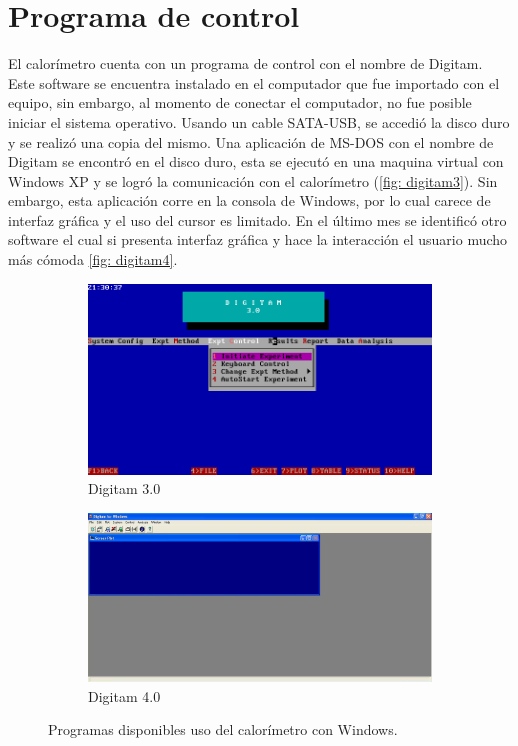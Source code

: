 	\section{Programa de control}
	El calorímetro cuenta con un programa de control con el nombre de Digitam. Este software se encuentra instalado en el computador que fue importado con el equipo, sin embargo, al momento de conectar el computador, no fue posible iniciar el sistema operativo. Usando un cable SATA-USB, se accedió la disco duro y se realizó una copia del mismo. Una aplicación de MS-DOS con el nombre de Digitam se encontró en el disco duro, esta se ejecutó en una maquina virtual con Windows XP y se logró la comunicación con el calorímetro (\autoref{fig: digitam3}). Sin embargo, esta aplicaci\'on corre en la consola de Windows, por lo cual carece de interfaz gr\'afica y el uso del cursor es limitado. En el \'ultimo mes se identific\'o otro software el cual si presenta interfaz gr\'afica y hace la interacci\'on el usuario mucho m\'as c\'omoda \autoref{fig: digitam4}.
	\begin{figure}[h]
		\centering
		\begin{subfigure}{0.45\linewidth}
			\includegraphics[width=\linewidth]{Figures/digitam}
			\caption{Digitam 3.0}
			\label{fig: digitam3}
		\end{subfigure}
		\begin{subfigure}{0.54\linewidth}
			\includegraphics[width=\linewidth]{Figures/digitamView}
			\caption{Digitam 4.0}
			\label{fig: digitam4}
		\end{subfigure}
		\caption{Programas disponibles uso del calor\'imetro con Windows.}
	\end{figure}
	
